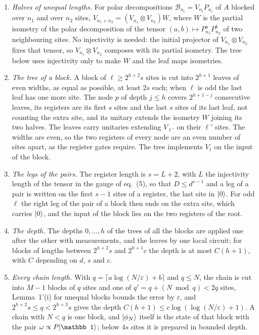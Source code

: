 \documentclass{article}
\begin{document}
\begin{enumerate}
    \item \emph{Halves of unequal lengths.} For polar decompositions
          $\mathcal B_{n_i}=V_{n_i}P_{n_i}$ of $A$ blocked over $n_1$ and over
          $n_2$ sites, $V_{n_1+n_2}=(V_{n_1}\otimes V_{n_2})W$, where $W$ is the
          partial isometry of the polar decomposition of the tensor
          $(a,b)\mapsto P_{n_1}^aP_{n_2}^b$ of two neighbouring sites. No
          injectivity is needed: the initial projector of
          $V_{n_1}\otimes V_{n_2}$ fixes that tensor, so
          $V_{n_1}\otimes V_{n_2}$ composes with its partial isometry. The tree
          below uses injectivity only to make $W$ and the leaf maps isometries.
    \item \emph{The tree of a block.} A block of $\ell\ge2^{h+2}s$ sites is cut
          into $2^{h+1}$ leaves of even widths, as equal as possible, at least
          $2s$ each; when $\ell$ is odd the last leaf has one more site. The node
          $p$ of depth $j\le h$ covers $2^{h+1-j}$ consecutive leaves, its
          registers are its first $s$ sites and the last $s$ sites of its last
          leaf, not counting the extra site, and its unitary extends the isometry
          $W$ joining its two halves. The leaves carry unitaries extending
          $V_{\ell'}$ on their $\ell'$ sites. The widths are even, so the two
          registers of every node are an even number of sites apart, as the
          register gates require. The tree implements $V_\ell$ on the input of
          the block.
    \item \emph{The legs of the pairs.} The register length is $s=L+2$, with $L$
          the injectivity length of the tensor in the gauge of eq.~(5), so that
          $D\le d^{s-1}$ and a leg of a pair is written on the first $s-1$ sites
          of a register, the last site in $|0\rangle$. For odd $\ell$ the right leg
          of the pair of a block then ends on the extra site, which carries
          $|0\rangle$, and the input of the block lies on the two registers of the
          root.
    \item \emph{The depth.} The depths $0,\dots,h$ of the trees of all the blocks
          are applied one after the other with measurements, and the leaves by
          one local circuit; for blocks of lengths between $2^{h+2}s$ and
          $2^{h+1}c$ the depth is at most $C(h+1)$, with $C$ depending on $d$, $s$
          and $c$.
    \item \emph{Every chain length.} With $q=\lceil a\log(N/\varepsilon)+b\rceil$
          and $q\le N$, the chain is cut into $M-1$ blocks of $q$ sites and one of
          $q'=q+(N\bmod q)<2q$ sites, Lemma~1'(i) for unequal blocks bounds the
          error by $\varepsilon$, and $2^{h+2}s\le q<2^{h+3}s$ gives the depth
          $C(h+1)\le c\log(\log(N/\varepsilon)+1)$. A chain with $N<q$ is one
          block, and $|\phi_N\rangle$ itself is the state of that block with the
          pair $\omega\propto P\ket{\mathbb 1}$; below $4s$ sites it is prepared
          in bounded depth.
\end{enumerate}
\end{document}
